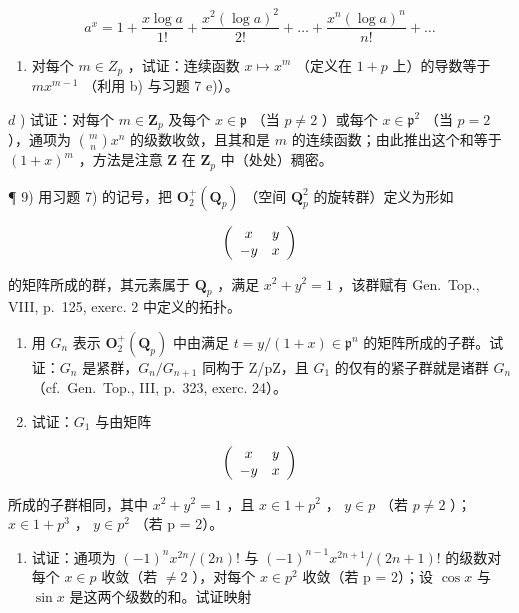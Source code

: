 \[
a ^ {x} = 1 + \frac {x \log a}{1 !} + \frac {x ^ {2} (\log a) ^ {2}}{2 !} + \dots + \frac {x ^ {n} (\log a) ^ {n}}{n !} + \dots
\]

\begin{enumerate}
\def\labelenumi{\alph{enumi})}
\setcounter{enumi}{2}
\tightlist
\item
  对每个 \(m \in Z_{p}\) ，试证：连续函数 \(x \mapsto x^{m}\) （定义在 \(1 + p\) 上）的导数等于 \(mx^{m-1}\) （利用 b) 与习题 7 e)）。
\end{enumerate}

\(d\) ) 试证：对每个 \(m\in \mathbf{Z}_p\) 及每个 \(x\in \mathfrak{p}\) （当 \(p\neq 2\) ）或每个 \(x\in \mathfrak{p}^2\) （当 \(p = 2\) ），通项为 \(\binom{m}{n}x^n\) 的级数收敛，且其和是 \(m\) 的连续函数；由此推出这个和等于 \((1 + x)^m\) ，方法是注意 \(\mathbf{Z}\) 在 \(\mathbf{Z}_p\) 中（处处）稠密。

¶ 9) 用习题 7) 的记号，把 \(\mathbf{O}_2^+ (\mathbf{Q}_p)\) （空间 \(\mathbf{Q}_p^2\) 的旋转群）定义为形如

\[
\left( \begin{array}{c c} x & y \\ - y & x \end{array} \right)
\]

的矩阵所成的群，其元素属于 \(\mathbf{Q}_p\) ，满足 \(x^2 + y^2 = 1\) ，该群赋有 Gen.~Top., VIII, p.~125, exerc. 2 中定义的拓扑。

\begin{enumerate}
\def\labelenumi{\alph{enumi})}
\item
  用 \(G_{n}\) 表示 \(\mathbf{O}_{2}^{+}(\mathbf{Q}_{p})\) 中由满足 \(t=y/(1+x)\in\mathfrak{p}^{n}\) 的矩阵所成的子群。试证：\(G_{n}\) 是紧群，\(G_{n}/G_{n+1}\) 同构于 Z/pZ，且 \(G_{1}\) 的仅有的紧子群就是诸群 \(G_{n}\) （cf.~Gen.~Top., III, p.~323, exerc. 24）。
\item
  试证：\(G_{1}\) 与由矩阵
\end{enumerate}

\[
\left( \begin{array}{c c} x & y \\ - y & x \end{array} \right)
\]

所成的子群相同，其中 \(x^{2} + y^{2} = 1\) ，且 \(x \in 1 + p^{2}\) ， \(y \in p\) （若 \(p \neq 2\) ）；\(x \in 1 + p^{3}\) ， \(y \in p^{2}\) （若 p = 2）。

\begin{enumerate}
\def\labelenumi{\alph{enumi})}
\setcounter{enumi}{2}
\tightlist
\item
  试证：通项为 \((-1)^{n} x^{2n}/(2n)!\) 与 \((-1)^{n-1} x^{2n+1}/(2n+1)!\) 的级数对每个 \(x \in p\) 收敛（若 \(\neq 2\) ），对每个 \(x \in p^{2}\) 收敛（若 p = 2）；设 \(\cos x\) 与 \(\sin x\) 是这两个级数的和。试证映射
\end{enumerate}

